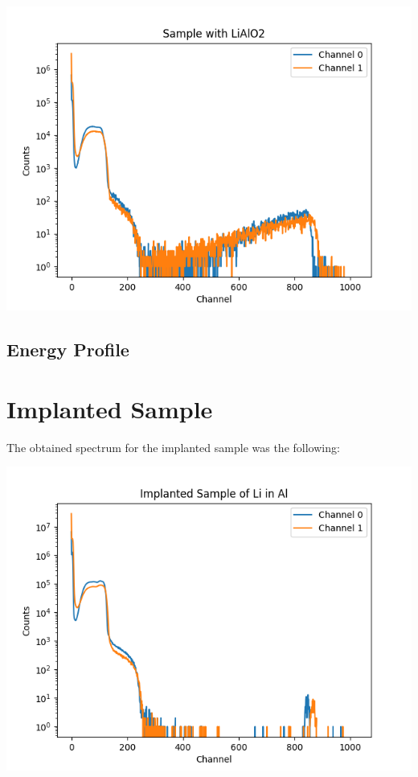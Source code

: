 \documentclass{article}
\begin{document}
\begin{multicols}{2}
\begin{center}
    \label{TT_21}
    \centering
    \includegraphics[scale = 0.6]{../images/SampleLiAlO2.png}
\end{center}

\subsection{Energy Profile}



\section{Implanted Sample}

The obtained spectrum for the implanted sample was the following:

\begin{center}
    \label{TT_21}
    \centering
    \includegraphics[scale = 0.6]{../images/ImplantedSample.png}
\end{center}




\end{multicols}
\end{document}
